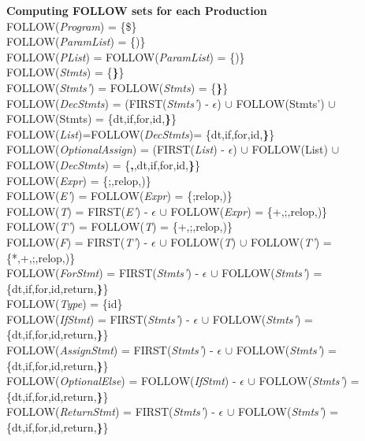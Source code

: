 \documentclass[12pt]{article}
\begin{document}
\begin{framed}
\textbf{Computing FOLLOW sets for each Production}\\
FOLLOW(\textit{Program}) = \{\$\}\\
FOLLOW(\textit{ParamList}) = \{)\}\\
FOLLOW(\textit{PList}) = FOLLOW(\textit{ParamList}) = \{)\}\\
FOLLOW(\textit{Stmts}) = \{\textbf{\}}\}\\
FOLLOW(\textit{Stmts'}) = FOLLOW(\textit{Stmts}) = \{\textbf{\}}\}\\
FOLLOW(\textit{DecStmts}) = (FIRST(\textit{Stmts'}) - $\epsilon$) $\cup$ FOLLOW(Stmts') $\cup$ FOLLOW(Stmts) = \{dt,if,for,id,\textbf{\}}\}\\
FOLLOW(\textit{List})=FOLLOW(\textit{DecStmts})= \{dt,if,for,id,\textbf{\}}\}\\
FOLLOW(\textit{OptionalAssign}) = (FIRST(\textit{List}) - $\epsilon$) $\cup$ FOLLOW(List)  $\cup$ FOLLOW(\textit{DecStmts}) = \{\textbf{,},dt,if,for,id,\textbf{\}}\}\\
FOLLOW(\textit{Expr}) = \{;,relop,)\}\\
FOLLOW(\textit{E'}) = FOLLOW(\textit{Expr}) = \{;relop,)\}\\
FOLLOW(\textit{T}) = FIRST(\textit{E'}) - $\epsilon$ $\cup$ FOLLOW(\textit{Expr}) = \{+,;,relop,)\}\\
FOLLOW(\textit{T'}) = FOLLOW(\textit{T}) = \{+,;,relop,)\}\\
FOLLOW(\textit{F}) = FIRST(\textit{T'}) - $\epsilon$ $\cup$ FOLLOW(\textit{T}) $\cup$ FOLLOW(\textit{T'}) = \{*,+,;,relop,)\}\\
FOLLOW(\textit{ForStmt}) = FIRST(\textit{Stmts'}) - $\epsilon$ $\cup$ FOLLOW(\textit{Stmts'}) = \{dt,if,for,id,return,\textbf{\}}\}\\
FOLLOW(\textit{Type}) = \{id\}\\
FOLLOW(\textit{IfStmt}) = FIRST(\textit{Stmts'}) - $\epsilon$ $\cup$ FOLLOW(\textit{Stmts'}) = \{dt,if,for,id,return,\textbf{\}}\}\\
FOLLOW(\textit{AssignStmt}) = FIRST(\textit{Stmts'}) - $\epsilon$ $\cup$ FOLLOW(\textit{Stmts'}) = \{dt,if,for,id,return,\textbf{\}}\}\\
FOLLOW(\textit{OptionalElse}) = FOLLOW(\textit{IfStmt}) - $\epsilon$ $\cup$ FOLLOW(\textit{Stmts'}) = \{dt,if,for,id,return,\textbf{\}}\}\\
FOLLOW(\textit{ReturnStmt}) = FIRST(\textit{Stmts'}) - $\epsilon$ $\cup$ FOLLOW(\textit{Stmts'}) = \{dt,if,for,id,return,\textbf{\}}\}\\
\end{framed}
\end{document}
